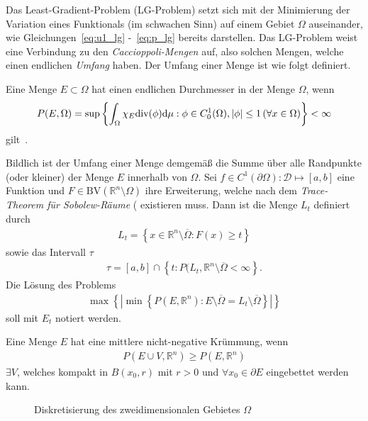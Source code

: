 Das Least-Gradient-Problem (LG-Problem) setzt sich mit der Minimierung der Variation eines Funktionals (im schwachen Sinn) auf einem Gebiet $\Omega$ auseinander, wie Gleichungen~\eqref{eq:u1_lg} -~\eqref{eq:p_lg} bereits darstellen. Das LG-Problem weist eine Verbindung zu den \emph{Caccioppoli-Mengen} auf, also solchen Mengen, welche einen endlichen \emph{Umfang} haben. Der Umfang einer Menge ist wie folgt definiert.
\begin{Definitionbox}
    Eine Menge $E\subset \Omega$ hat einen endlichen Durchmesser in der Menge $\Omega$, wenn
    \begin{align}
        P(E,\Omega)=\sup \left\{ \int_{\Omega} \chi_E \text{div}(\phi)\text{d} \mu : \phi \in C^{1}_0 (\Omega), |\phi| \leq 1 \, (\forall x\in \Omega) \right\} < \infty
    \end{align}
    gilt~\cite[nach][S. 194]{evans_measure_2015}.
\end{Definitionbox}
Bildlich ist der Umfang einer Menge demgemäß die Summe über alle Randpunkte (oder kleiner) der Menge $E$ innerhalb von $\Omega$. Sei $f\in C^1(\partial\Omega):\mathcal{D} \mapsto [a,b]$ eine Funktion und $F\in \text{BV}(\mathbb{R}^n\setminus \Omega)$ ihre Erweiterung, welche nach dem \emph{Trace-Theorem für Sobolew-Räume} (%
existieren muss. Dann ist die Menge $L_t$ definiert durch
\begin{align*}
    L_t=\left\{ x\in \mathbb{R}^n \setminus \overline{\Omega} : F(x) \geq t \right\}
\end{align*}
sowie das Intervall $\tau$
\begin{align*}
    \tau = [a,b] \cap \left\{ t : P(L_t,\mathbb{R}^n \setminus \overline{\Omega} < \infty \right\}.
\end{align*}
Die Lösung des Problems
\begin{align}
    \max\left\{ \left|\min \left\{ P(E,\mathbb{R}^n) : E \setminus \overline{\Omega} = L_t \setminus \overline{\Omega} \right\} \right| \right\}
\end{align}
soll mit $E_t$ notiert werden.
\begin{Definitionbox}
    Eine Menge $E$ hat eine mittlere nicht-negative Krümmung, wenn
    \begin{align*}
        P(E\cup V,\mathbb{R}^n) \geq P(E,\mathbb{R}^n)
    \end{align*}
    $\exists V$, welches kompakt in $B(x_0, r)$ mit $r>0$ und $\forall x_0 \in \partial E$ eingebettet werden kann.
\end{Definitionbox}
\begin{figure}
    \centering
    \def\svgwidth{0.75\textwidth}
    
    \caption{Diskretisierung des zweidimensionalen Gebietes $\Omega$}
    \label{fig:meshs}
\end{figure}
